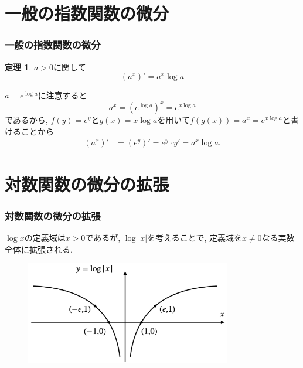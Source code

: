 \documentclass[dvipdfmx,cjk,10.2pt]{beamer}
\theoremstyle{definition}
\newtheorem{Thm}{定理}[section]
\begin{document}



\section{一般の指数関数の微分}


\begin{frame}
\frametitle{一般の指数関数の微分}


\begin{Thm} 
$a>0$に関して
$$(a^x)'=a^x \log a$$
\end{Thm}

$a=e^{\log a}$に注意すると
$$
a^x=(e^{\log a})^x=e^{x \log a}
$$
であるから, 
$f(y)=e^y$と$g(x)=x \log a$を用いて$f(g(x))=a^x=e^{x \log a}$と書けることから
\begin{align*} 
(a^x)' &= (e^y)'  =e^y \cdot y' =a^x \log a. 
\end{align*}


\end{frame}




\section{対数関数の微分の拡張}

\begin{frame}
\frametitle{対数関数の微分の拡張}

$\log x$の定義域は$x>0$であるが, $\log |x|$を考えることで, 定義域を$x\neq 0$なる実数全体に拡張される. 

 \begin{figure}[htbp]
 \begin{center} 
  \includegraphics[width=90mm]{log_abs.png}
 \end{center}
\end{figure}


\end{frame}
\end{document}
